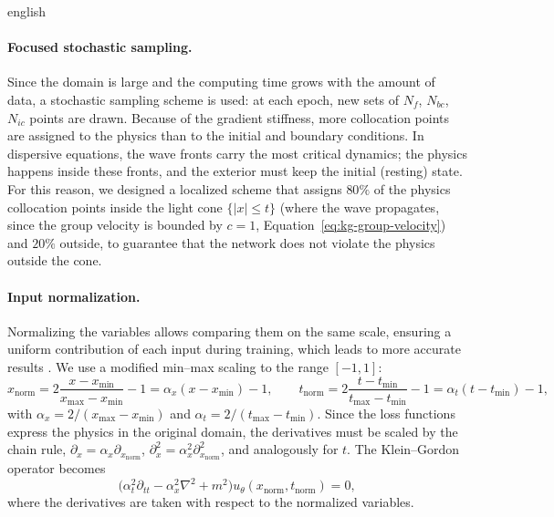 \documentclass[11pt,letterpaper,twoside,openright]{book} %
\newcommand{\abs}[1]{\left\lvert #1 \right\rvert}
\begin{document}
\begin{hyphenrules}{english}
\paragraph{Focused stochastic sampling.}\label{subsec:sampling}
Since the domain is large and the computing time grows with the amount of data, a stochastic sampling
scheme is used: at each epoch, new sets of $N_f$, $N_{bc}$, $N_{ic}$ points are drawn. Because of the
gradient stiffness, more collocation points are assigned to the physics than to the initial and boundary
conditions. In dispersive equations, the wave fronts carry the most critical dynamics; the physics happens
inside these fronts, and the exterior must keep the initial (resting) state. For this reason, we designed
a localized scheme that assigns $80\%$ of the physics collocation points inside the light cone
$\{\abs{x}\le t\}$ (where the wave propagates, since the group velocity is bounded by $c=1$,
Equation~\eqref{eq:kg-group-velocity}) and $20\%$ outside, to guarantee that the network does not violate the physics
outside the cone.

\paragraph{Input normalization.}
Normalizing the variables allows comparing them on the same scale, ensuring a uniform contribution of each
input during training, which leads to more accurate results \cite{xu2025preprocessing}. We use a
modified min--max scaling to the range $[-1,1]$:
\begin{equation}
  x_{\mathrm{norm}}=2\frac{x-x_{\min}}{x_{\max}-x_{\min}}-1=\alpha_x(x-x_{\min})-1,\qquad
  t_{\mathrm{norm}}=2\frac{t-t_{\min}}{t_{\max}-t_{\min}}-1=\alpha_t(t-t_{\min})-1,
  \label{eq:normalization}
\end{equation}
with $\alpha_x=2/(x_{\max}-x_{\min})$ and $\alpha_t=2/(t_{\max}-t_{\min})$. Since the loss functions
express the physics in the original domain, the derivatives must be scaled by the chain rule,
$\partial_x=\alpha_x\partial_{x_{\mathrm{norm}}}$, $\partial_x^2=\alpha_x^2\partial^2_{x_{\mathrm{norm}}}$,
and analogously for $t$. The Klein--Gordon operator becomes
\begin{equation}
  \big(\alpha_t^2\partial_{tt}-\alpha_x^2\nabla^2+m^2\big)u_\theta(x_{\mathrm{norm}},t_{\mathrm{norm}})=0,
  \label{eq:kg-normalized}
\end{equation}
where the derivatives are taken with respect to the normalized variables.


\end{hyphenrules}
\end{document}
